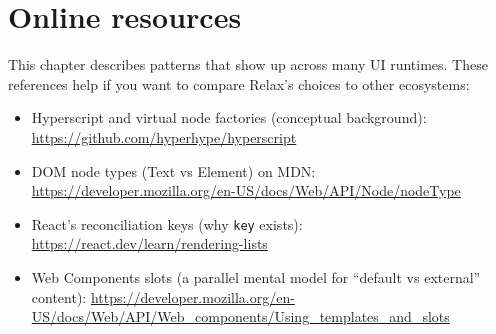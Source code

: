 \section{Online resources}
This chapter describes patterns that show up across many UI runtimes. These references help if you want to compare Relax's choices to other ecosystems:

\begin{itemize}
  \item Hyperscript and virtual node factories (conceptual background): \href{https://github.com/hyperhype/hyperscript}{https://github.com/hyperhype/hyperscript}
  \item DOM node types (Text vs Element) on MDN: \href{https://developer.mozilla.org/en-US/docs/Web/API/Node/nodeType}{https://developer.mozilla.org/en-US/docs/Web/API/Node/nodeType}
  \item React's reconciliation keys (why \texttt{key} exists): \href{https://react.dev/learn/rendering-lists}{https://react.dev/learn/rendering-lists}
  \item Web Components slots (a parallel mental model for ``default vs external'' content): \href{https://developer.mozilla.org/en-US/docs/Web/API/Web_components/Using_templates_and_slots}{\url{https://developer.mozilla.org/en-US/docs/Web/API/Web_components/Using_templates_and_slots}}
\end{itemize}
